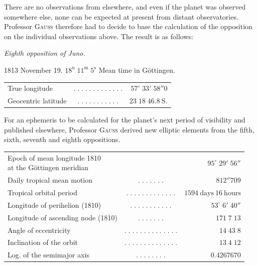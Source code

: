 \par\indent There are no observations from elsewhere, and even if the planet was observed somewhere else, none can be expected at present from distant observatories. Professor \textsc{Gauss} therefore had to decide to base the calculation of the opposition on the individual observations above. The result is as follows:
\begin{center}\leavevmode{}\emph{Eighth opposition of Juno.}\end{center}
\begin{center}1813 November 19. $18^{\mathrm u}\;11^{\mathrm m}\;5^{\mathrm s}$ Mean time in Göttingen.\end{center}
\begin{center}\fontsize{10}{12}\selectfont\setlength{\tabcolsep}{2pt}\renewcommand{\arraystretch}{1.15}\begin{tabular}{lcr}
True longitude & $.\;.\;.\;.\;.\;.\;.\;.\;.\;.\;.\;.\;.$ & $57^\circ\;33'\;58''0$\\
Geocentric latitude & $.\;.\;.\;.\;.\;.\;.\;.\;.\;.\;.$ & $23\;18\;46.8\ \text{S.}$\\
\end{tabular}\end{center}
\par\indent For an ephemeris to be calculated for the planet’s next period of visibility and published elsewhere, Professor \textsc{Gauss} derived new elliptic elements from the fifth, sixth, seventh and eighth oppositions.
\begin{center}\fontsize{9}{11}\selectfont\setlength{\tabcolsep}{2pt}\renewcommand{\arraystretch}{1.15}\begin{tabular}{lcr}
\shortstack[l]{Epoch of mean longitude 1810\\at the Göttingen meridian} &  & $95^\circ\;29'\;56''$\\
Daily tropical mean motion & $.\;.\;.\;.\;.\;.\;.$ & $812''709$\\
Tropical orbital period & $.\;.\;.\;.\;.\;.\;.\;.\;.\;.\;.\;.\;.$ & $1594\ \text{days}\ 16\ \text{hours}$\\
Longitude of perihelion (1810) & $.\;.\;.\;.\;.\;.\;.\;.\;.\;.\;.$ & $53^\circ\;6'\;40''$\\
Longitude of ascending node (1810) & $.\;.\;.\;.\;.\;.\;.$ & $171\;7\;13$\\
Angle of eccentricity & $.\;.\;.\;.\;.\;.\;.\;.\;.\;.\;.\;.\;.\;.$ & $14\;43\;8$\\
Inclination of the orbit & $.\;.\;.\;.\;.\;.\;.\;.\;.\;.\;.\;.\;.\;.$ & $13\;4\;12$\\
Log. of the semimajor axis & $.\;.\;.\;.\;.\;.\;.\;.$ & $0.4267670$\\
\end{tabular}\end{center}
